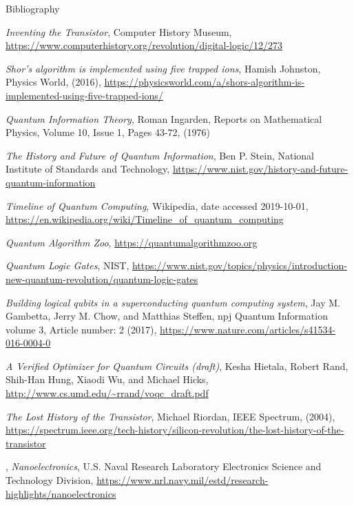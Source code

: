\documentclass[handout]{beamer}
\begin{document}
\begin{frame}[allowframebreaks]{Bibliography}
\begin{thebibliography}{99}
    \emph{Inventing the Transistor}, %
    Computer History Museum, %
    \url{https://www.computerhistory.org/revolution/digital-logic/12/273}

    \emph{Shor’s algorithm is implemented using five trapped ions}, %
    Hamish Johnston, Physics World, (2016), %
    \url{https://physicsworld.com/a/shors-algorithm-is-implemented-using-five-trapped-ions/}

    \emph{Quantum Information Theory}, %
    Roman Ingarden, %
    Reports on Mathematical Physics, %
    Volume 10, Issue 1, Pages 43-72, (1976)

    \emph{The History and Future of Quantum Information}, %
    Ben P. Stein, National Institute of Standards and Technology, %
    \url{https://www.nist.gov/history-and-future-quantum-information}

    \emph{Timeline of Quantum Computing}, %
    Wikipedia, date accessed 2019-10-01, %
    \url{https://en.wikipedia.org/wiki/Timeline_of_quantum_computing}

    \emph{Quantum Algorithm Zoo}, %
    \url{https://quantumalgorithmzoo.org}

    \emph{Quantum Logic Gates}, %
    NIST, %
    \url{https://www.nist.gov/topics/physics/introduction-new-quantum-revolution/quantum-logic-gates}

    \emph{Building logical qubits in a superconducting quantum computing
      system}, %
    Jay M. Gambetta, Jerry M. Chow, and Matthias Steffen, %
    npj Quantum Information volume 3, Article number: 2 (2017), %
    \url{https://www.nature.com/articles/s41534-016-0004-0}

    \emph{A Verified Optimizer for Quantum Circuits (draft)}, %
    Kesha Hietala, Robert Rand, Shih-Han Hung, Xiaodi Wu, and Michael
    Hicks, %
    \url{http://www.cs.umd.edu/~rrand/voqc_draft.pdf}

    \emph{The Lost History of the Transistor}, %
    Michael Riordan, IEEE Spectrum, (2004), %
    \url{https://spectrum.ieee.org/tech-history/silicon-revolution/the-lost-history-of-the-transistor}

  , %
    \emph{Nanoelectronics}, %
    U.S. Naval Research Laboratory Electronics Science and Technology
    Division, %
    \url{https://www.nrl.navy.mil/estd/research-highlights/nanoelectronics}
    

\end{thebibliography}
\end{frame}
\end{document}
